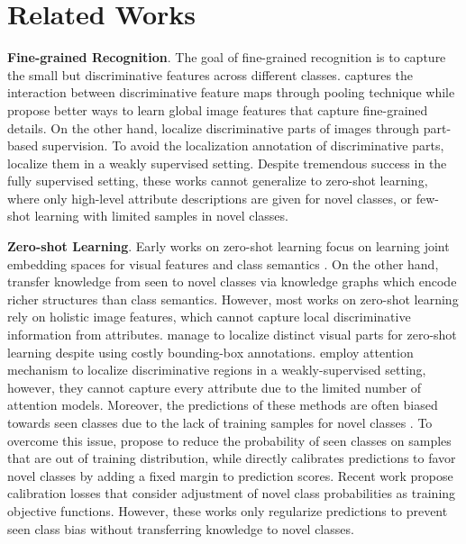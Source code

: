 \documentclass[10pt,journal,compsoc]{IEEEtran}
\newcommand{\1}{\boldsymbol{1}}
\newcommand{\0}{\boldsymbol{0}}
\newcommand{\<}{\langle}
\renewcommand{\>}{\rangle}
\newcommand{\myparagraph}[1]{\vspace{-2pt}\medskip\noindent\textbf{#1}}
\begin{document}
\section{Related Works}
\label{sec:related_works}

\myparagraph{Fine-grained Recognition}. The goal of fine-grained recognition is to capture the small but discriminative features across different classes. \cite{Kong:CVPR17,Gao:CVPR16,Lin:ICCV15,Yu:ECCV18} captures the interaction between discriminative feature maps through pooling technique while \cite{Larry:CVPR18,Dubey:ECCV18,Zhang:ICCV19} propose better ways to learn global image features that capture fine-grained details. 
On the other hand, \cite{Zhang:CVPR16,Lin:CVPR15} localize discriminative parts of images through part-based supervision. To avoid the localization annotation of discriminative parts, \cite{Sun:ECCV18,Zheng:ICCV17,Ding:ICCV19,Zheng:CVPR19} localize them in a weakly supervised setting. Despite tremendous success in the fully supervised setting, these works cannot generalize to zero-shot learning, where only high-level attribute descriptions are given for novel classes, or few-shot learning with limited samples in novel classes. 

\myparagraph{Zero-shot Learning}. Early works on zero-shot learning focus on learning joint embedding spaces for visual features and class semantics \cite{Changpinyo:CVPR16,Frome:NIPS13,Norouzi:ICLR14,Xian:CVPR16,Zhang:CVPR16}.
On the other hand, \cite{Lee:CVPR18,Ding:CVPR19,Kampffmeyer:CVPR19,Wang_Gupta:CVPR18} transfer knowledge from seen to novel classes via knowledge graphs which encode richer structures than class semantics.
However, most works on zero-shot learning \cite{Felix:ECCV18,Xian:CVPR19,Schonfeld:CVPR19,Zhu:ICCV19,Huang:CVPR19,Sariyildiz:CVPR19,Changpinyo:CVPR16,Zhang:CVPR16,Xian:CVPR17} rely on holistic image features, which cannot capture local discriminative information from attributes. 
\cite{Yu:NIPS18,elhoseiny:CVPR17} manage to localize distinct visual parts for zero-shot learning despite using costly bounding-box annotations. 
\cite{Huynh-multiatt:CVPR20, Xie:CVPR19,Zhu:NIPS19,Zhu:CVPR19} employ attention mechanism to localize discriminative regions in a weakly-supervised setting, however, they cannot capture every attribute due to the limited number of attention models.
Moreover, the predictions of these methods are often biased towards seen classes due to the lack of training samples for novel classes \cite{Bucher:ICCVW17,Fu:PAMI15}. 
To overcome this issue, \cite{Socher:NIPS13,Atzmon:CVPR18} propose to reduce the probability of seen classes on samples that are out of training distribution, while \cite{Chao:ECCV16} directly calibrates predictions to favor novel classes by adding a fixed margin to prediction scores. Recent work \cite{Huynh-finegrained:CVPR20,Liu:NIPS18} propose calibration losses that consider adjustment of novel class probabilities as training objective functions. However, these works only regularize predictions to prevent seen class bias without transferring knowledge to novel classes.
\end{document}
